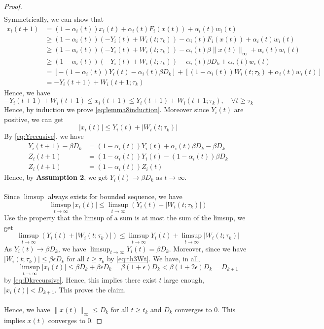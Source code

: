 \begin{proof}
\begin{align*}
    \end{align*}
    Symmetrically, we can show that
    \begin{align*}
         x_i(t+1) &= (1-\alpha_i(t))x_i(t) + \alpha_i(t)F_i(x(t)) + \alpha_i(t)w_i(t)\\
         &\ge (1-\alpha_i(t))(-Y_i(t) + W_i(t;\tau_k)) - \alpha_i(t)F_i(x(t)) + \alpha_i(t)w_i(t)\tag{Induction}\\
         &\ge (1-\alpha_i(t))(-Y_i(t) + W_i(t;\tau_k)) - \alpha_i(t)\beta\|x(t)\|_\infty + \alpha_i(t)w_i(t)\tag{Assumption 3}\\
         &\ge (1-\alpha_i(t))(-Y_i(t) + W_i(t;\tau_k)) - \alpha_i(t)\beta D_k + \alpha_i(t)w_i(t)\tag{$\|x(t)\|_\infty \le D_k$}\\
         & =[-(1-\alpha_i(t))Y_i(t) - \alpha_i(t)\beta D_k] + [(1-\alpha_i(t)) W_i(t;\tau_k) + \alpha_i(t)w_i(t)]\\
         &= -Y_i(t+1) + W_i(t+1;\tau_k)
    \end{align*}
    Hence, we have
    $$
    -Y_i(t+1) + W_i(t+1)\le x_i(t+1)\le Y_i(t+1) + W_i(t+1;\tau_k),\quad\forall t\ge \tau_k
    $$
    Hence, by induction we prove \autoref{eq:lemma8induction}. Moreover since $Y_i(t)$ are positive, we can get
    \begin{equation}\label{eq:xiboundedlast}
        |x_i(t)| \le Y_i(t) + |W_i(t;\tau_k)|
    \end{equation}
    By \autoref{eq:Yrecusive}, we have
    \begin{align*}
        Y_i(t+1) -\beta D_k &= (1-\alpha_i(t))Y_i(t)+\alpha_i(t)\beta D_k -\beta D_k\\
        Z_i(t+1) &= (1-\alpha_i(t))Y_i(t)-(1-\alpha_i(t))\beta D_k\tag{$Z_i(t):= Y_i(t)-\beta D_k$}\\
        Z_i(t+1) &= (1-\alpha_i(t)) Z_i(t)
    \end{align*}
    Hence, by \textbf{Assumption 2}, we get $Y_i(t)\to \beta D_k$ as $t\to \infty$.\\
    \\
    Since $\limsup$ always exists for bounded sequence, we have
    \begin{equation}
        \limsup_{t\to\infty} |x_i(t)| \le \limsup_{t\to\infty} (Y_i(t) + |W_i(t;\tau_k)|)
    \end{equation}
    Use the property that the limsup of a sum is at most the sum of the limsup, we get
    $$
    \limsup_{t\to\infty} (Y_i(t) + |W_i(t;\tau_k)|)\le \limsup_{t\to\infty} Y_i(t) + \limsup_{t\to\infty} |W_i(t;\tau_k)|
    $$
    As $Y_i(t)\to \beta D_k$, we have $\limsup_{t\to \infty} Y_i(t) = \beta D_k$. Moreover, since we have $|W_i(t;\tau_k)|\le \beta\epsilon D_k$ for all $t\ge \tau_k$ by \autoref{eq:th3Wt}. We have, in all,
    $$
    \limsup_{t\to\infty} |x_i(t)| \le \beta D_k  + \beta \epsilon D_k = \beta(1+\epsilon) D_k<\beta(1+2\epsilon) D_k =D_{k+1}
    $$
    by \autoref{eq:Dkrecursive}. Hence, this implies there exist $t$ large enough, $|x_i(t)|<D_{k+1}$. This proves the claim.\\
    \\
    Hence, we have $\|x(t)\|_\infty\le D_k$ for all $t\ge t_k$ and $D_k$ converges to $0$. This implies $x(t)$ converges to $0$.
\end{proof}
